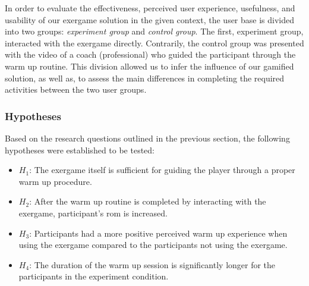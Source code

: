 In order to evaluate the effectiveness, perceived user experience, usefulness, and usability of our exergame solution in the given context, the user base is divided into two groups: \textit{experiment group} and \textit{control group}. The first, experiment group, interacted with the exergame directly. Contrarily, the control group was presented with the video of a coach (professional) who guided the participant through the warm up routine. This division allowed us to infer the influence of our gamified solution, as well as, to assess the main differences in completing the required activities between the two user groups. 
\subsubsection{Hypotheses}
Based on the research questions outlined in the previous section, the following hypotheses were established to be tested: 
\begin{itemize}
\item \begin{math}H_{1}\end{math}: The exergame itself is sufficient for guiding the player through a proper warm up procedure.
\item \begin{math}H_{2}\end{math}: After the warm up routine is completed by interacting with the exergame, participant's \gls{rom} is increased.
\item \begin{math}H_{3}\end{math}: Participants had a more positive perceived warm up experience when using the exergame compared to the participants not using the exergame.  
\item \begin{math}H_{4}\end{math}: The duration of the warm up session is significantly longer for the participants in the experiment condition.
\end{itemize}
